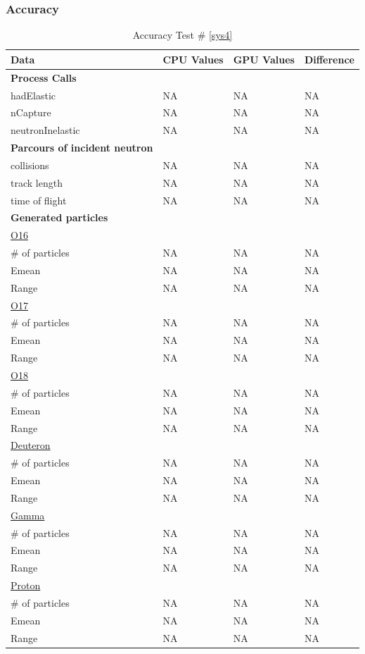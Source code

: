 \documentclass[12pt]{article}
\begin{document}
	\subsubsection{Accuracy}
		\begin{table}[!htbp]
		\centering
		\caption{Accuracy Test \# \ref{sys4}}\label{_acc}
		\begin{tabular}{llll}
		\toprule
		\bf Data & CPU Values & GPU Values & Difference\\\midrule
		\bf Process Calls&&&\\
		hadElastic&NA&NA&NA\\
		nCapture&NA&NA&NA\\
		neutronInelastic&NA&NA&NA\\ 
		\bf Parcours of incident neutron&&&\\
		collisions&NA&NA&NA\\
		track length&NA&NA&NA\\
		time of flight&NA&NA&NA\\
		\bf Generated particles&&&\\
		\underline{O16}&&&\\
		\# of particles&NA&NA&NA\\
		Emean&NA&NA&NA\\
		Range&NA&NA&NA\\
		\underline{O17}&&&\\
		\# of particles&NA&NA&NA\\
		Emean&NA&NA&NA\\
		Range&NA&NA&NA\\
		\underline{O18}&&&\\
		\# of particles&NA&NA&NA\\
		Emean&NA&NA&NA\\
		Range&NA&NA&NA\\
		\underline{Deuteron}&&&\\
		\# of particles&NA&NA&NA\\
		Emean&NA&NA&NA\\
		Range&NA&NA&NA\\
		\underline{Gamma}&&&\\
		\# of particles&NA&NA&NA\\
		Emean&NA&NA&NA\\
		Range&NA&NA&NA\\
		\underline{Proton}&&&\\
		\# of particles&NA&NA&NA\\
		Emean&NA&NA&NA\\
		Range&NA&NA&NA\\
		\end{tabular}
		\end{table}
		\break
\end{document}
